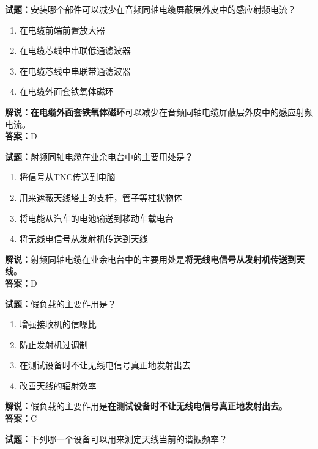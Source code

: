 \documentclass{ctexbook}
\begin{document}
\bigskip


\noindent\textbf{试题：}安装哪个部件可以减少在音频同轴电缆屏蔽层外皮中的感应射频电流？

\begin{enumerate}[leftmargin=3em]
	\item 在电缆前端前置放大器
	\item 在电缆芯线中串联低通滤波器
	\item 在电缆芯线中串联带通滤波器
	\item 在电缆外面套铁氧体磁环
\end{enumerate}

\noindent\textbf{解说：}\textbf{在电缆外面套铁氧体磁环}可以减少在音频同轴电缆屏蔽层外皮中的感应射频电流。\\\noindent\textbf{答案：}D


\bigskip


\noindent\textbf{试题：}射频同轴电缆在业余电台中的主要用处是？

\begin{enumerate}[leftmargin=3em]
	\item 将信号从TNC传送到电脑
	\item 用来遮蔽天线塔上的支杆，管子等柱状物体
	\item 将电能从汽车的电池输送到移动车载电台
	\item 将无线电信号从发射机传送到天线
\end{enumerate}

\noindent\textbf{解说：}射频同轴电缆在业余电台中的主要用处是\textbf{将无线电信号从发射机传送到天线}。\\\noindent\textbf{答案：}D


\bigskip


\noindent\textbf{试题：}假负载的主要作用是？

\begin{enumerate}[leftmargin=3em]
	\item 增强接收机的信噪比
	\item 防止发射机过调制
	\item 在测试设备时不让无线电信号真正地发射出去
	\item 改善天线的辐射效率
\end{enumerate}

\noindent\textbf{解说：}假负载的主要作用是\textbf{在测试设备时不让无线电信号真正地发射出去}。\\\noindent\textbf{答案：}C


\bigskip


\noindent\textbf{试题：}下列哪一个设备可以用来测定天线当前的谐振频率？
\end{document}
